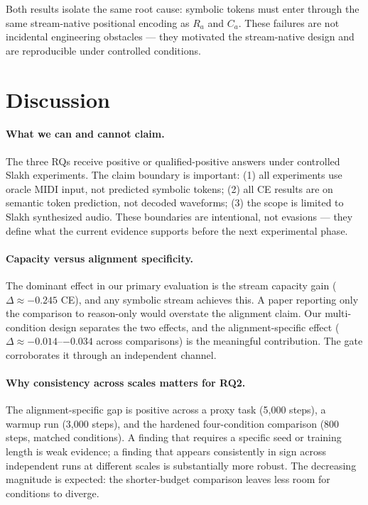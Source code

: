 \documentclass[11pt]{article}
\newcommand{\Ramath}{R_a}
\newcommand{\Camath}{C_a}
\begin{document}
Both results isolate the same root cause: symbolic tokens must enter through the same
stream-native positional encoding as $\Ramath$ and $\Camath$.  These failures are not
incidental engineering obstacles --- they motivated the stream-native design and are
reproducible under controlled conditions.

\section{Discussion}

\paragraph{What we can and cannot claim.}
The three RQs receive positive or qualified-positive answers under controlled Slakh
experiments.  The claim boundary is important: (1) all experiments use oracle MIDI
input, not predicted symbolic tokens; (2) all CE results are on semantic token
prediction, not decoded waveforms; (3) the scope is limited to Slakh synthesized audio.
These boundaries are intentional, not evasions --- they define what the current evidence
supports before the next experimental phase.

\paragraph{Capacity versus alignment specificity.}
The dominant effect in our primary evaluation is the stream capacity gain
($\Delta \approx -0.245$ CE), and any symbolic stream achieves this.  A paper reporting
only the comparison to reason-only would overstate the alignment claim.  Our
multi-condition design separates the two effects, and the alignment-specific effect
($\Delta \approx -0.014$--$-0.034$ across comparisons) is the meaningful contribution.
The gate corroborates it through an independent channel.

\paragraph{Why consistency across scales matters for RQ2.}
The alignment-specific gap is positive across a proxy task (5,000 steps), a warmup run
(3,000 steps), and the hardened four-condition comparison (800 steps, matched
conditions).  A finding that requires a specific seed or training length is weak
evidence; a finding that appears consistently in sign across independent runs at
different scales is substantially more robust.  The decreasing magnitude is expected:
the shorter-budget comparison leaves less room for conditions to diverge.
\end{document}
